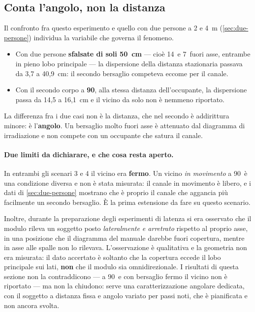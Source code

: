 \subsection{Conta l'angolo, non la distanza}

Il confronto fra questo esperimento e quello con due persone a 2 e 4~m
(\cref{sec:due-persone}) individua la variabile che governa il fenomeno.

\begin{itemize}[leftmargin=1.4em,itemsep=3pt]
  \item Con due persone \textbf{sfalsate di soli 50~cm} --- cioè 14\textdegree\ e
        7\textdegree\ fuori asse, entrambe in pieno lobo principale --- la dispersione
        della distanza stazionaria passava da 3,7 a 40,9~cm: il secondo bersaglio
        competeva eccome per il canale.
  \item Con il secondo corpo a \textbf{90\textdegree}, alla stessa distanza
        dell'occupante, la dispersione passa da 14,5 a 16,1~cm e il vicino da solo non
        è nemmeno riportato.
\end{itemize}

La differenza fra i due casi non è la distanza, che nel secondo è addirittura minore:
è l'\textbf{angolo}. Un bersaglio molto fuori asse è attenuato dal diagramma di
irradiazione e non compete con un occupante che satura il canale.

\paragraph{Due limiti da dichiarare, e che cosa resta aperto.} In entrambi gli
scenari 3 e 4 il vicino era \textbf{fermo}. Un vicino \emph{in movimento} a
90\textdegree\ è una condizione diversa e non è stata misurata: il canale in movimento
è libero, e i dati di \cref{sec:due-persone} mostrano che è proprio il canale che
aggancia più facilmente un secondo bersaglio. È la prima estensione da fare su questo
scenario.

Inoltre, durante la preparazione degli esperimenti di latenza si era osservato che il
modulo rileva un soggetto posto \emph{lateralmente e arretrato} rispetto al proprio
asse, in una posizione che il diagramma del manuale darebbe fuori copertura, mentre in
asse alle spalle non lo rilevava. L'osservazione è qualitativa e la geometria non era
misurata: il dato accertato è soltanto che la copertura eccede il lobo principale sui
lati, \textbf{non} che il modulo sia omnidirezionale. I risultati di questa sezione
non la contraddicono --- a 90\textdegree\ e con bersaglio fermo il vicino non è
riportato --- ma non la chiudono: serve una caratterizzazione angolare dedicata, con
il soggetto a distanza fissa e angolo variato per passi noti, che è pianificata e non
ancora svolta.


